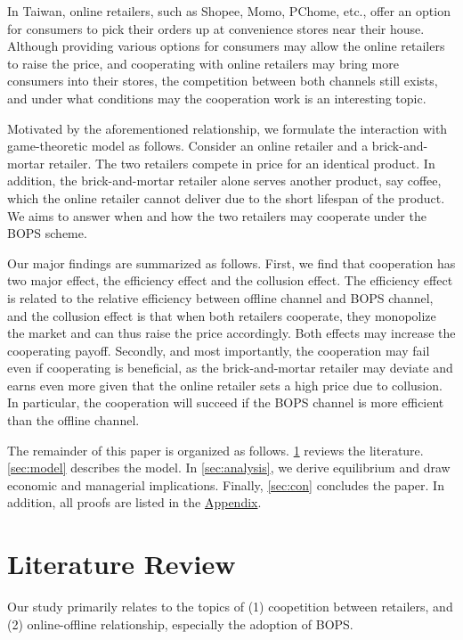 \documentclass[a4paper]{article}
\theoremstyle{definition}
\theoremstyle{plain}
\theoremstyle{remark}
\begin{document}
In Taiwan,
online retailers,
such as Shopee, Momo, PChome, etc.,
offer an option for consumers to pick their orders up at convenience stores near their house.
Although providing various options for consumers may allow the online retailers to raise the price,
and cooperating with online retailers may bring more consumers into their stores,
the competition between both channels still exists,
and under what conditions may the cooperation work is an interesting topic.

Motivated by the aforementioned relationship,
we formulate the interaction with game-theoretic model as follows.
Consider an online retailer and a brick-and-mortar retailer.
The two retailers compete in price for an identical product.
In addition,
the brick-and-mortar retailer alone serves another product,
say coffee,
which the online retailer cannot deliver due to the short lifespan of the product.
We aims to answer when and how the two retailers may cooperate under the BOPS scheme.

Our major findings are summarized as follows.
First,
we find that cooperation has two major effect,
the efficiency effect and the collusion effect.
The efficiency effect is related to the relative efficiency between offline channel and BOPS channel,
and the collusion effect is that when both retailers cooperate,
they monopolize the market and can thus raise the price accordingly.
Both effects may increase the cooperating payoff.
Secondly,
and most importantly,
the cooperation may fail even if cooperating is beneficial,
as the brick-and-mortar retailer may deviate and earns even more given that the online retailer sets a high price due to collusion.
In particular,
the cooperation will succeed if the BOPS channel is more efficient than the offline channel.

The remainder of this paper is organized as follows.
\cref{sec:lit} reviews the literature.
\cref{sec:model} describes the model.
In \cref{sec:analysis},
we derive equilibrium and draw economic and managerial implications.
Finally,
\cref{sec:con} concludes the paper.
In addition,
all proofs are listed in the \hyperlink{sec:app}{Appendix}.

\section{Literature Review}\label{sec:lit}
Our study primarily relates to the topics of (1) coopetition between retailers,
and (2) online-offline relationship,
especially the adoption of BOPS.
\end{document}
